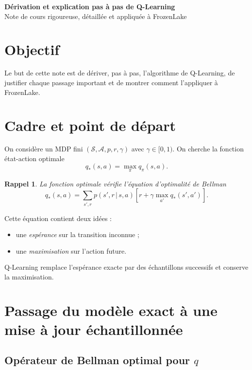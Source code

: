 \documentclass[11pt,a4paper]{article}
\newtheorem*{rappel}{Rappel}
\newcommand{\given}{\,|\,}
\begin{document}
\begin{center}
    {\LARGE\bfseries Dérivation et explication pas à pas de Q-Learning}\\[0.4em]
    {\large Note de cours rigoureuse, détaillée et appliquée à FrozenLake}
\end{center}

\vspace{0.6em}

\section{Objectif}

Le but de cette note est de dériver, pas à pas, l'algorithme de Q-Learning, de justifier chaque passage important et de montrer comment l'appliquer à FrozenLake.

\section{Cadre et point de départ}

On considère un MDP fini $(\mathcal S,\mathcal A,p,r,\gamma)$ avec $\gamma \in [0,1)$. On cherche la fonction état-action optimale
\[
q_*(s,a)=\max_{\pi} q_{\pi}(s,a).
\]

\begin{rappel}
La fonction optimale vérifie l'équation d'optimalité de Bellman
\[
q_*(s,a)=\sum_{s',r} p(s',r\given s,a)\left[r+\gamma \max_{a'} q_*(s',a')\right].
\]
\end{rappel}

Cette équation contient deux idées :
\begin{itemize}[leftmargin=1.6em]
    \item une \emph{espérance} sur la transition inconnue ;
    \item une \emph{maximisation} sur l'action future.
\end{itemize}
Q-Learning remplace l'espérance exacte par des échantillons successifs et conserve la maximisation.

\section{Passage du modèle exact à une mise à jour échantillonnée}

\subsection{Opérateur de Bellman optimal pour $q$}
\end{document}
